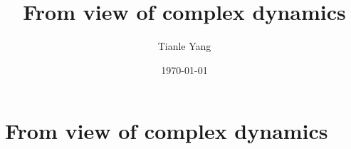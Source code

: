\documentclass[sectionlevel=section,status=draft]{noteformyself}
\title{From view of complex dynamics}
\author{Tianle Yang}
\date{\today}
\begin{document}
\maketitle

    \section[
      status=draft,
      tag=00000,
      label=\labelNFM{sec:the-first-introduction:from-view-of-complex-dynamics}
    ]{From view of complex dynamics}



\end{document}
